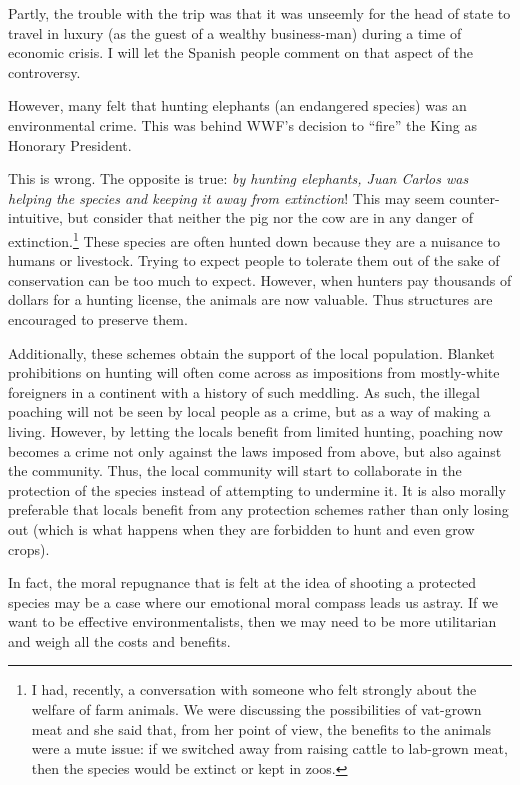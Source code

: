 Partly, the trouble with the trip was that it was unseemly for the head of
state to travel in luxury (as the guest of a wealthy business-man) during a
time of economic crisis. I will let the Spanish people comment on that aspect
of the controversy.

However, many felt that hunting elephants (an endangered species) was an
environmental crime. This was behind WWF's decision to ``fire'' the King as
Honorary President.

This is wrong. The opposite is true: \emph{by hunting elephants, Juan Carlos
was helping the species and keeping it away from extinction}! This may seem
counter-intuitive, but consider that neither the pig nor the cow are in any
danger of extinction.\footnote{I had, recently, a conversation with someone who
felt strongly about the welfare of farm animals. We were discussing the
possibilities of vat-grown meat and she said that, from her point of view, the
benefits to the animals were a mute issue: if we switched away from raising
cattle to lab-grown meat, then the species would be extinct or kept in zoos.}
These species are often hunted down because they are a nuisance to humans or
livestock. Trying to expect people to tolerate them out of the sake of
conservation can be too much to expect. However, when hunters pay thousands of
dollars for a hunting license, the animals are now valuable. Thus structures
are encouraged to preserve them.

Additionally, these schemes obtain the support of the local population. Blanket
prohibitions on hunting will often come across as impositions from mostly-white
foreigners in a continent with a history of such meddling. As such, the illegal
poaching will not be seen by local people as a crime, but as a way of making a
living. However, by letting the locals benefit from limited hunting, poaching
now becomes a crime not only against the laws imposed from above, but also
against the community. Thus, the local community will start to collaborate in
the protection of the species instead of attempting to undermine it. It is also
morally preferable that locals benefit from any protection schemes rather than
only losing out (which is what happens when they are forbidden to hunt and even
grow crops).


In fact, the moral repugnance that is felt at the idea of shooting a protected
species may be a case where our emotional moral compass leads us astray. If we
want to be effective environmentalists, then we may need to be more utilitarian
and weigh all the costs and benefits.

